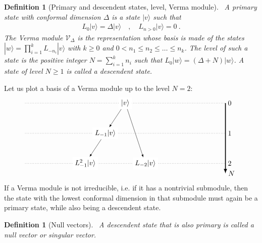 \documentclass[12pt, a4paper]{article}
\theoremstyle{break}
\newtheorem{defn}[exo]{Definition}
\begin{document}
\begin{defn}[Primary and descendent states, level, Verma module]
 ~\label{def:prim}
 A primary state with conformal dimension $\Delta$ is a state $|v\rangle$ such that 
 \begin{align}
  L_0 |v\rangle = \Delta |v\rangle \quad , \quad L_{n>0} |v\rangle = 0\ .
 \end{align}
 The Verma module $\mathcal V_\Delta$ is the representation whose basis is made of the states $|w\rangle = \prod_{i=1}^k L_{-n_i} |v\rangle$ with $k\geq 0$ and $0<n_1\leq n_2 \leq \dots \leq n_k$. 
The level of such a state is the positive integer $N=\sum_{i=1}^k n_i$ such that $L_0|w\rangle = (\Delta + N)|w\rangle$. A state of level $N\geq 1$ is called a descendent state.
\end{defn}
Let us plot a basis of a Verma module up to the level $N=2$:
\begin{align}
 \begin{tikzpicture}[scale = .25, baseline=(current  bounding  box.center)]
  \draw[-latex, very thick] (20, 0) -- (20, -14) node [right] {$N$};
  \foreach \x in {0, ..., 2}
  {
  \draw [dotted] (-20, {-6*\x}) -- (20, {-6*\x}) node [right] {${\x}$};
  }
  \node[fill = white] at (0, 0) (0) {$|v\rangle$};
  \node[fill = white] at (-4,-6) (1) {$L_{-1}|v\rangle$};
  \node[fill = white] at (-8, -12) (11) {$L_{-1}^2|v\rangle$};
  \node[fill = white] at (4,-12) (2) {$L_{-2}|v\rangle$};
  \draw[-latex] (0) -- (1);
  \draw[-latex] (1) -- (11);
  \draw[-latex] (0) -- (2);
 \end{tikzpicture}
\end{align}
If a Verma module is not irreducible, i.e. if it has a nontrivial submodule, then the state with the lowest conformal dimension in that submodule must again be a primary state, while also being a descendent state.

\begin{defn}[Null vectors]
 ~\label{def:nv}
 A descendent state that is also primary is called a null vector or singular vector.
\end{defn}
\end{document}
